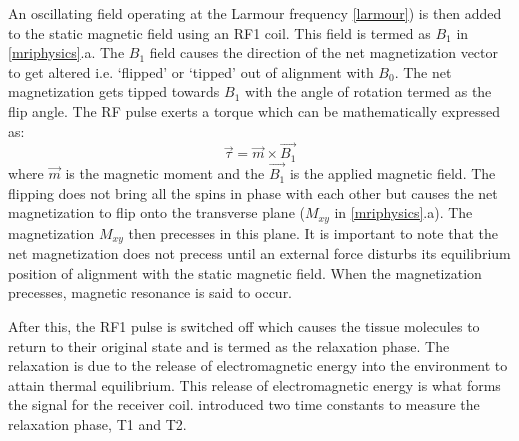 \documentclass[msthesis.tex]{subfiles}
\begin{document}
An oscillating field operating at the Larmour frequency \cref{larmour}) is then added to the static magnetic field using an \gls{RF1} coil. This field is termed as $B_1$ in \cref{mriphysics}.a. The $B_1$ field causes the direction of the net magnetization vector to get altered i.e. ‘flipped’ or ‘tipped’ out of alignment with $B_0$. The net magnetization gets tipped towards $B_1$ with the angle of rotation termed as the flip angle. The RF pulse exerts a torque which can be mathematically expressed as:
\begin{equation}
    \Vec{\tau} = \Vec{m} \times \Vec{B_1}
\end{equation}
where $\Vec{m}$ is the magnetic moment and the $ \Vec{B_1}$ is the applied magnetic field. The flipping does not bring all the spins in phase with each other but causes the net magnetization to flip onto the transverse plane ($M_{xy}$ in \cref{mriphysics}.a). The magnetization $M_{xy}$ then precesses in this plane. It is important to note that the net magnetization does not precess until an external force disturbs its equilibrium position of alignment with the static magnetic field. When the magnetization precesses, magnetic resonance is said to occur.

After this, the \gls{RF1} pulse is switched off which causes the tissue molecules to return to their original state and is termed as the relaxation phase. The relaxation is due to the release of electromagnetic energy into the environment to attain thermal equilibrium. This release of electromagnetic energy is what forms the signal for the receiver coil. \cite{PhysRev.70.460} introduced two time constants to measure the relaxation phase, T1 and T2.
\end{document}
